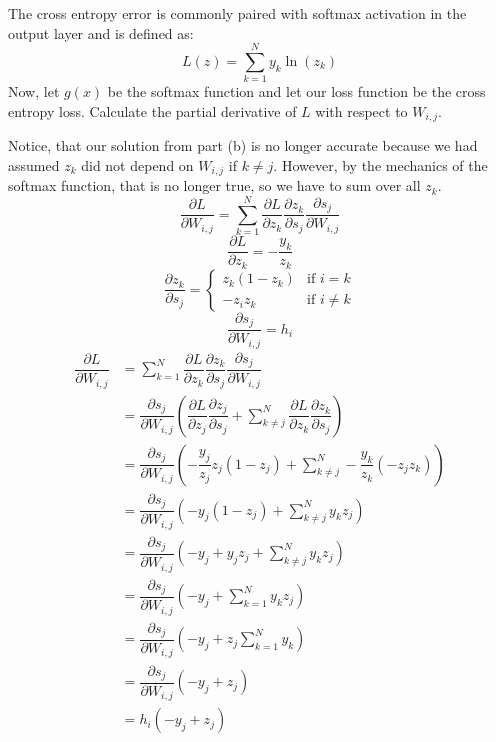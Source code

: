 \begin{Parts}
The cross entropy error is commonly paired with softmax activation in the output layer and is defined as:
$$ L(z) = \sum_{k=1}^N y_k \ln (z_k)$$
Now, let $g(x)$ be the softmax function and let our loss function be the cross entropy loss. Calculate the partial derivative of $L$ with respect to $W_{i,j}$.

\begin{solution}
Notice, that our solution from part (b) is no longer accurate because we had assumed $z_k$ did not depend on $W_{i,j}$ if $k \neq j$. However, by the mechanics of the softmax function, that is no longer true, so we have to sum over all $z_k$.
$$ \dfrac{\partial L}{\partial W_{i,j}} = \sum_{k=1}^N \dfrac{\partial L}{\partial z_k} \dfrac{\partial z_k}{\partial s_j} \dfrac{\partial s_j}{\partial W_{i,j}}$$
$$ \dfrac{\partial L}{\partial z_k} = -\dfrac{y_k}{z_k}$$
\[
  \dfrac{\partial z_k}{\partial s_j} =
  \begin{cases}
  z_k(1-z_k)                         & \text{if $i=k$} \\
  -z_i z_k                           & \text{if $i\neq k$}
  \end{cases}
\]
$$ \dfrac{\partial s_j}{\partial W_{i,j}} = h_i $$
\begin{align*}
\dfrac{\partial L}{\partial W_{i,j}} 
&= \sum_{k=1}^N \dfrac{\partial L}{\partial z_k} \dfrac{\partial z_k}{\partial s_j} \dfrac{\partial s_j}{\partial W_{i,j}}\\ 
&= \dfrac{\partial s_j}{\partial W_{i,j}} (\dfrac{\partial L}{\partial z_j} \dfrac{\partial z_j}{\partial s_j} + \sum_{k \neq j}^N \dfrac{\partial L}{\partial z_k} \dfrac{\partial z_k}{\partial s_j})\\
&= \dfrac{\partial s_j}{\partial W_{i,j}} (-\dfrac{y_j}{z_j} z_j(1-z_j) + \sum_{k \neq j}^N -\dfrac{y_k}{z_k} (-z_j z_k))\\
&= \dfrac{\partial s_j}{\partial W_{i,j}} (-y_j (1-z_j) + \sum_{k \neq j}^N  y_k z_j )\\
&= \dfrac{\partial s_j}{\partial W_{i,j}} (-y_j + y_j z_j + \sum_{k \neq j}^N  y_k z_j )\\
&= \dfrac{\partial s_j}{\partial W_{i,j}} (-y_j + \sum_{k = 1}^N  y_k z_j )\\
&= \dfrac{\partial s_j}{\partial W_{i,j}} (-y_j + z_j \sum_{k = 1}^N  y_k  )\\
&= \dfrac{\partial s_j}{\partial W_{i,j}} (-y_j + z_j)\\
&= h_i (-y_j + z_j)\\
\end{align*}

\end{solution}
\end{Parts}

\newpage